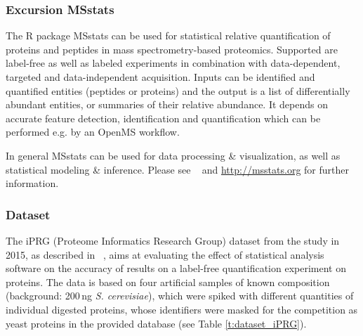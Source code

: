 
\subsubsection{Excursion MSstats}
The R package MSstats can be used for statistical relative quantification of proteins and peptides in mass spectrometry-based proteomics. Supported are label-free as well as labeled experiments in combination with data-dependent, targeted and data-independent acquisition. Inputs can be identified and quantified entities (peptides or proteins) and the output is a list of differentially abundant entities, or summaries of their relative abundance. It depends on accurate feature detection, identification and quantification which can be performed e.g. by an OpenMS workflow. 

\noindent In general MSstats can be used for data processing \& visualization, as well as statistical modeling \& inference. Please see ~\cite{Choi2014MSstats} and \url{http://msstats.org} for further information.

\subsubsection{Dataset}
The iPRG (Proteome Informatics Research Group) dataset from the study in 2015, as described in ~\cite{Choi2017iPRG}, aims at evaluating the effect of statistical analysis software on the accuracy of results on a label-free quantification experiment on proteins. The data is based on four artificial samples of known composition (background: 200\,ng \emph{S. cerevisiae}), which were spiked with different quantities of individual digested proteins, whose identifiers were masked for the competition as yeast proteins in the provided database (see Table \ref{t:dataset_iPRG}).

